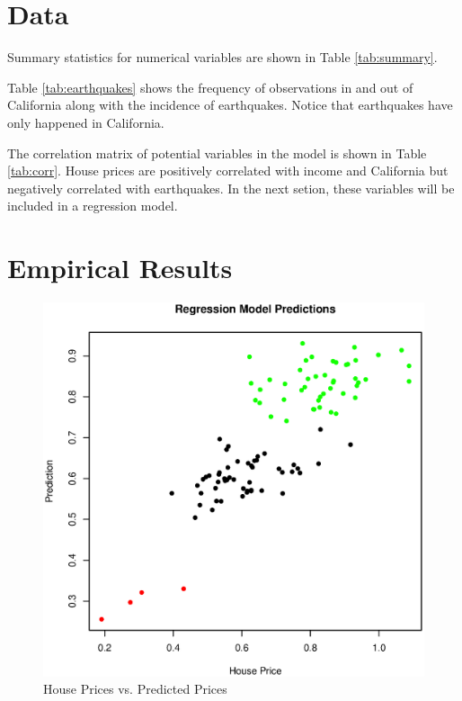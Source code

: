 \documentclass{paper}
\begin{document}


\section{Data}

Summary statistics for numerical variables are shown in Table \ref{tab:summary}. 




Table \ref{tab:earthquakes} shows the frequency of observations in and out of California along with the incidence of earthquakes. Notice that earthquakes have only happened in California. 



The correlation matrix of potential variables in the model is shown in Table \ref{tab:corr}. 
House prices are positively correlated with income and California but negatively correlated with earthquakes. In the next setion, these variables will be included in a regression model. 





\pagebreak
\section{Empirical Results}


\begin{figure}
\centering
\includegraphics[width=\textwidth]{../Figures/predictions.eps}
\caption{House Prices vs. Predicted Prices}
\label{fig:pred}
\end{figure}
\end{document}
